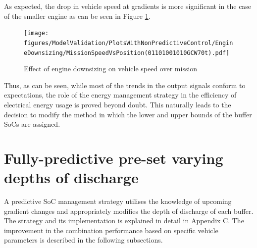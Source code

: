 \documentclass[ExampleMasters.tex]{subfiles}
\begin{document}
	As expected, the drop in vehicle speed at gradients is more significant in the case of the smaller engine as can be seen in Figure \ref{speedEngineDownsizing}.
	\begin{figure}
	\centering
	\texttt{[image: figures/ModelValidation/PlotsWithNonPredictiveControl/EngineDownsizing/MissionSpeedVsPosition(01101001010GCW70t).pdf]}
	\caption{Effect of engine downsizing on vehicle speed over mission}
	\label{speedEngineDownsizing}
	\end{figure}
	Thus, as can be seen, while most of the trends in the output signals conform to expectations, the role of the energy management strategy in the efficiency of electrical energy usage is proved beyond doubt. This naturally leads to the decision to modify the method in which the lower and upper bounds of the buffer SoCs are assigned.
	\section{Fully-predictive pre-set varying depths of discharge}
	A predictive SoC management strategy utilises the knowledge of upcoming gradient changes and appropriately modifies the depth of discharge of each buffer. The strategy and its implementation is explained in detail in Appendix C. The improvement in the combination performance based on specific vehicle parameters is described in the following subsections.
\end{document}

